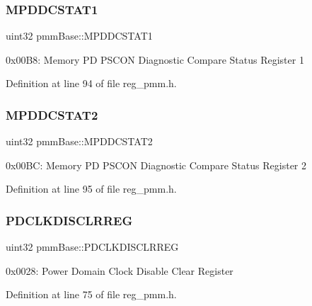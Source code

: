 \subsubsection{\texorpdfstring{M\+P\+D\+D\+C\+S\+T\+A\+T1}{MPDDCSTAT1}}
{\footnotesize\ttfamily uint32 pmm\+Base\+::\+M\+P\+D\+D\+C\+S\+T\+A\+T1}

0x00\+B8\+: Memory PD P\+S\+C\+ON Diagnostic Compare Status Register 1 

Definition at line 94 of file reg\+\_\+pmm.\+h.

\mbox{\label{structpmmBase_a521748e4a9be26d429a09ffb43678daa}} 
\subsubsection{\texorpdfstring{M\+P\+D\+D\+C\+S\+T\+A\+T2}{MPDDCSTAT2}}
{\footnotesize\ttfamily uint32 pmm\+Base\+::\+M\+P\+D\+D\+C\+S\+T\+A\+T2}

0x00\+BC\+: Memory PD P\+S\+C\+ON Diagnostic Compare Status Register 2 

Definition at line 95 of file reg\+\_\+pmm.\+h.

\mbox{\label{structpmmBase_a8c0d6a62a65cdf5495ab9a28561ab5ff}} 
\subsubsection{\texorpdfstring{P\+D\+C\+L\+K\+D\+I\+S\+C\+L\+R\+R\+EG}{PDCLKDISCLRREG}}
{\footnotesize\ttfamily uint32 pmm\+Base\+::\+P\+D\+C\+L\+K\+D\+I\+S\+C\+L\+R\+R\+EG}

0x0028\+: Power Domain Clock Disable Clear Register 

Definition at line 75 of file reg\+\_\+pmm.\+h.

\mbox{\label{structpmmBase_ab365a9f74ed1f9b80c502386a49c4473}} 
